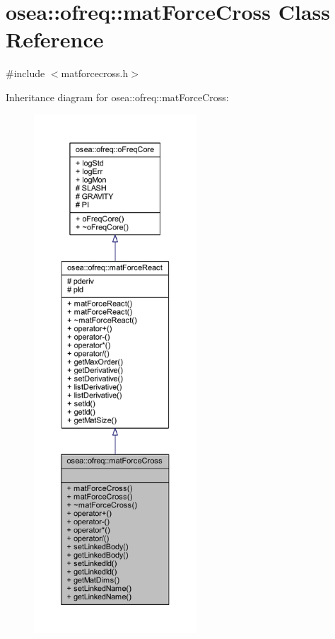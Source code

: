 \hypertarget{classosea_1_1ofreq_1_1mat_force_cross}{\section{osea\-:\-:ofreq\-:\-:mat\-Force\-Cross Class Reference}
\label{classosea_1_1ofreq_1_1mat_force_cross}
}


{\ttfamily \#include $<$matforcecross.\-h$>$}



Inheritance diagram for osea\-:\-:ofreq\-:\-:mat\-Force\-Cross\-:
\nopagebreak
\begin{figure}[H]
\begin{center}
\leavevmode
\includegraphics[height=550pt]{classosea_1_1ofreq_1_1mat_force_cross__inherit__graph}
\end{center}
\end{figure}
